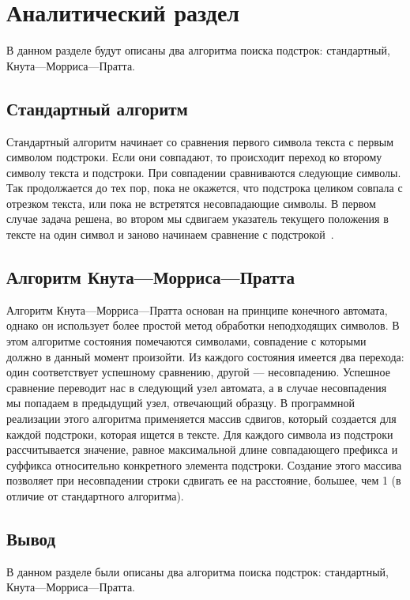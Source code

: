 \chapter{Аналитический раздел}

В данном разделе будут описаны два алгоритма поиска подстрок: стандартный, Кнута---Морриса---Пратта.

\section{Стандартный алгоритм}
Стандартный алгоритм начинает со сравнения первого символа текста с первым символом подстроки. Если они совпадают, то происходит переход ко второму символу текста и подстроки. При совпадении сравниваются следующие символы. Так продолжается до тех пор, пока не окажется, что подстрока целиком совпала с отрезком текста, или пока не встретятся несовпадающие символы. В первом случае задача решена, во втором мы сдвигаем указатель текущего положения в тексте на один символ и заново начинаем сравнение с подстрокой~\cite{aa}.

\section{Алгоритм Кнута---Морриса---Пратта}
Алгоритм Кнута---Морриса---Пратта основан на принципе конечного автомата, однако он использует более простой метод обработки неподходящих символов.
В этом алгоритме состояния помечаются символами, совпадение с которыми должно в данный момент произойти. 
Из каждого состояния имеется два перехода: один соответствует успешному сравнению, другой --- несовпадению. 
Успешное сравнение переводит нас в следующий узел автомата, а в случае несовпадения мы попадаем в предыдущий узел, отвечающий образцу. 
В программной реализации этого алгоритма применяется массив сдвигов, который создается для каждой подстроки, которая ищется в тексте.
Для каждого символа из подстроки рассчитывается значение, равное максимальной длине совпадающего префикса и суффикса относительно конкретного элемента подстроки. Создание этого массива позволяет при несовпадении строки сдвигать ее на расстояние, большее, чем 1 (в отличие от стандартного алгоритма).


\section*{Вывод}

В данном разделе были описаны два алгоритма поиска подстрок: стандартный, Кнута---Морриса---Пратта.
